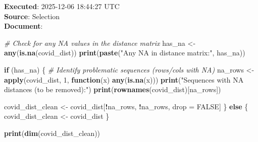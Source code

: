 \documentclass[
  11pt,
]{article}
\newenvironment{Shaded}{\begin{snugshade}}{\end{snugshade}}
\newcommand{\CommentTok}[1]{\textcolor[rgb]{0.56,0.35,0.01}{\textit{#1}}}
\newcommand{\ConstantTok}[1]{\textcolor[rgb]{0.56,0.35,0.01}{#1}}
\newcommand{\ControlFlowTok}[1]{\textcolor[rgb]{0.13,0.29,0.53}{\textbf{#1}}}
\newcommand{\DecValTok}[1]{\textcolor[rgb]{0.00,0.00,0.81}{#1}}
\newcommand{\FunctionTok}[1]{\textcolor[rgb]{0.13,0.29,0.53}{\textbf{#1}}}
\newcommand{\NormalTok}[1]{#1}
\newcommand{\OtherTok}[1]{\textcolor[rgb]{0.56,0.35,0.01}{#1}}
\newcommand{\SpecialCharTok}[1]{\textcolor[rgb]{0.81,0.36,0.00}{\textbf{#1}}}
\newcommand{\StringTok}[1]{\textcolor[rgb]{0.31,0.60,0.02}{#1}}
\begin{document}
\textbf{Executed}: 2025-12-06 18:44:27 UTC\\
\textbf{Source}: Selection\\
\textbf{Document}:

\begin{Shaded}
\begin{Highlighting}[]
\CommentTok{\# Check for any NA values in the distance matrix}
\NormalTok{has\_na }\OtherTok{\textless{}{-}} \FunctionTok{any}\NormalTok{(}\FunctionTok{is.na}\NormalTok{(covid\_dist))}
\FunctionTok{print}\NormalTok{(}\FunctionTok{paste}\NormalTok{(}\StringTok{"Any NA in distance matrix:"}\NormalTok{, has\_na))}

\ControlFlowTok{if}\NormalTok{ (has\_na) \{}
  \CommentTok{\# Identify problematic sequences (rows/cols with NA)}
\NormalTok{  na\_rows }\OtherTok{\textless{}{-}} \FunctionTok{apply}\NormalTok{(covid\_dist, }\DecValTok{1}\NormalTok{, }\ControlFlowTok{function}\NormalTok{(x) }\FunctionTok{any}\NormalTok{(}\FunctionTok{is.na}\NormalTok{(x)))}
  \FunctionTok{print}\NormalTok{(}\StringTok{"Sequences with NA distances (to be removed):"}\NormalTok{)}
  \FunctionTok{print}\NormalTok{(}\FunctionTok{rownames}\NormalTok{(covid\_dist)[na\_rows])}
  
\NormalTok{  covid\_dist\_clean }\OtherTok{\textless{}{-}}\NormalTok{ covid\_dist[}\SpecialCharTok{!}\NormalTok{na\_rows, }\SpecialCharTok{!}\NormalTok{na\_rows, drop }\OtherTok{=} \ConstantTok{FALSE}\NormalTok{]}
\NormalTok{\} }\ControlFlowTok{else}\NormalTok{ \{}
\NormalTok{  covid\_dist\_clean }\OtherTok{\textless{}{-}}\NormalTok{ covid\_dist}
\NormalTok{\}}

\FunctionTok{print}\NormalTok{(}\FunctionTok{dim}\NormalTok{(covid\_dist\_clean))}
\end{Highlighting}
\end{Shaded}
\end{document}
